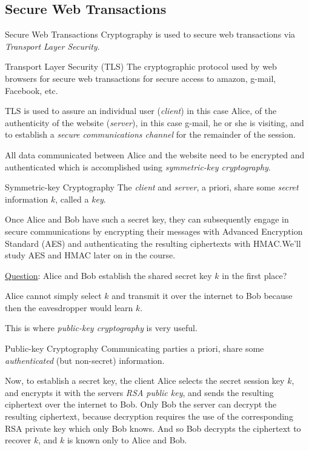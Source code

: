 \subsection*{Secure Web Transactions}
\begin{Example}{Secure Web Transactions}{}
    Cryptography is used to secure web transactions via
    \emph{Transport Layer Security}.

    \begin{Definition}{Transport Layer Security (TLS)}{}
        The cryptographic protocol used by web browsers for secure web transactions
        for secure access to amazon, g-mail, Facebook, etc.
    \end{Definition}
    TLS is used to assure
    an individual user (\emph{client}) in this case Alice, of the
    authenticity of the website (\emph{server}),
    in this case g-mail, he
    or she is visiting, and to
    establish a \emph{secure communications channel}
    for the remainder of the session.

    All data communicated between Alice and the
    website need to be encrypted and authenticated
    which is accomplished using
    \emph{symmetric-key cryptography}.

    \begin{Definition}{Symmetric-key Cryptography}{}
        The \emph{client} and \emph{server}, a
        priori, share some \emph{secret} information
        $ k $, called a \emph{key}.
    \end{Definition}

    Once Alice and Bob have such a secret key, they can subsequently
    engage in secure communications by encrypting their messages with
    Advanced Encryption Standard (AES) and authenticating the
    resulting ciphertexts with HMAC.\@ We'll study AES and
    HMAC later on in the course.
\end{Example}
\underline{Question}: Alice and Bob establish the
shared secret key $ k $ in the first place?

Alice cannot simply select $ k $ and
transmit it over the internet to Bob because
then the eavesdropper would learn $ k $.

This is where \emph{public-key cryptography} is very useful.

\begin{Definition}{Public-key Cryptography}{}
    Communicating parties a priori, share
    some \emph{authenticated} (but non-secret) information.
\end{Definition}
Now, to establish a secret key, the client Alice selects the secret session key $ k $,
and encrypts it with the servers \emph{RSA public key}, and sends the
resulting ciphertext over the internet to Bob. Only Bob the server can decrypt the resulting
ciphertext, because decryption requires the use of the corresponding
RSA private key which only Bob knows. And so Bob decrypts the ciphertext
to recover $ k $, and $ k $ is known only to Alice and Bob.

